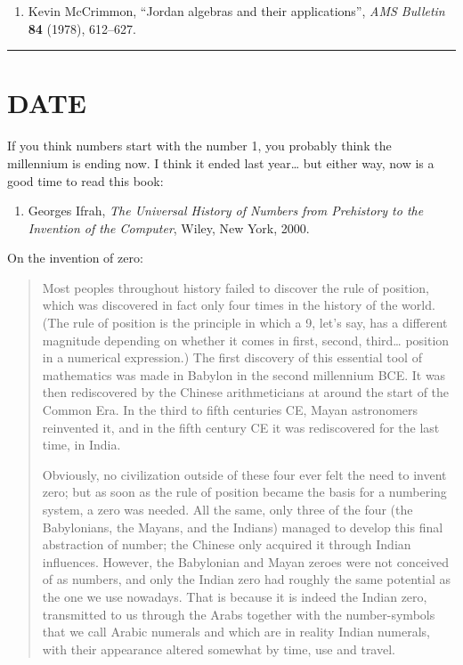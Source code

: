 \documentclass{article}
\def\tightlist{}
\begin{document}
\begin{enumerate}
\def\labelenumi{\arabic{enumi})}
\setcounter{enumi}{23}
\tightlist
\item
  Kevin McCrimmon, ``Jordan algebras and their applications'', \emph{AMS
  Bulletin} \textbf{84} (1978), 612--627.
\end{enumerate}

\begin{center}\rule{0.5\linewidth}{0.5pt}\end{center}
\hypertarget{week163}{%
\section{DATE}\label{week163}}

If you think numbers start with the number 1, you probably think the
millennium is ending now. I think it ended last year\ldots{} but either
way, now is a good time to read this book:

\begin{enumerate}
\def\labelenumi{\arabic{enumi})}
\tightlist
\item
  Georges Ifrah, \emph{The Universal History of Numbers from Prehistory
  to the Invention of the Computer}, Wiley, New York, 2000.
\end{enumerate}

On the invention of zero:

\begin{quote}
Most peoples throughout history failed to discover the rule of position,
which was discovered in fact only four times in the history of the
world. (The rule of position is the principle in which a 9, let's say,
has a different magnitude depending on whether it comes in first,
second, third\ldots{} position in a numerical expression.) The first
discovery of this essential tool of mathematics was made in Babylon in
the second millennium BCE. It was then rediscovered by the Chinese
arithmeticians at around the start of the Common Era. In the third to
fifth centuries CE, Mayan astronomers reinvented it, and in the fifth
century CE it was rediscovered for the last time, in India.

Obviously, no civilization outside of these four ever felt the need to
invent zero; but as soon as the rule of position became the basis for a
numbering system, a zero was needed. All the same, only three of the
four (the Babylonians, the Mayans, and the Indians) managed to develop
this final abstraction of number; the Chinese only acquired it through
Indian influences. However, the Babylonian and Mayan zeroes were not
conceived of as numbers, and only the Indian zero had roughly the same
potential as the one we use nowadays. That is because it is indeed the
Indian zero, transmitted to us through the Arabs together with the
number-symbols that we call Arabic numerals and which are in reality
Indian numerals, with their appearance altered somewhat by time, use and
travel.
\end{quote}
\end{document}
